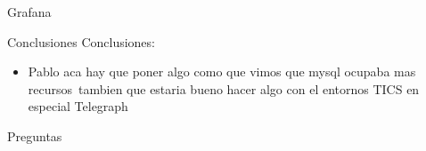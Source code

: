 \documentclass[aspectratio= 43]{beamer}
\begin{document}
\begin{frame}{Grafana}
\end{frame}


\begin{frame}{Conclusiones}
       Conclusiones:
        \begin{itemize}

            \item {Pablo aca hay que poner algo como que vimos que mysql ocupaba mas recursos\
            tambien que estaria bueno hacer algo con el entornos TICS en especial Telegraph }
        \end{itemize}
  \end{frame}


  \begin{frame}{Preguntas}
  \end{frame}
\end{document}
